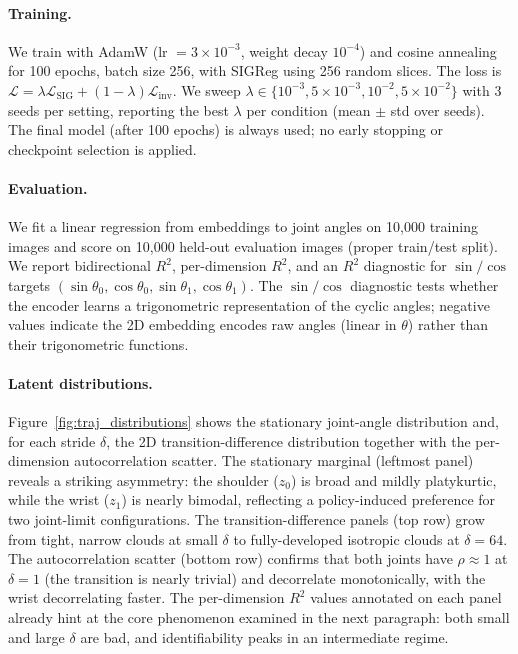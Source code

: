 \paragraph{Training.}
We train with AdamW (lr $= 3 \times 10^{-3}$, weight decay $10^{-4}$) and cosine annealing for 100 epochs, batch size 256, with SIGReg using 256 random slices.
The loss is $\mathcal{L} = \lambda \mathcal{L}_{\mathrm{SIG}} + (1 - \lambda) \mathcal{L}_{\mathrm{inv}}$.
We sweep $\lambda \in \{10^{-3}, 5 \times 10^{-3}, 10^{-2}, 5 \times 10^{-2}\}$ with 3 seeds per setting, reporting the best $\lambda$ per condition (mean $\pm$ std over seeds).
The final model (after 100 epochs) is always used; no early stopping or checkpoint selection is applied.

\paragraph{Evaluation.}
We fit a linear regression from embeddings to joint angles on 10{,}000 training images and score on 10{,}000 held-out evaluation images (proper train/test split).
We report bidirectional $R^2$, per-dimension $R^2$, and an $R^2$ diagnostic for $\sin/\cos$ targets $(\sin\theta_0, \cos\theta_0, \sin\theta_1, \cos\theta_1)$.
The $\sin/\cos$ diagnostic tests whether the encoder learns a trigonometric representation of the cyclic angles; negative values indicate the 2D embedding encodes raw angles (linear in $\theta$) rather than their trigonometric functions.

\paragraph{Latent distributions.}
Figure~\ref{fig:traj_distributions} shows the stationary joint-angle distribution and, for each stride $\delta$, the 2D transition-difference distribution together with the per-dimension autocorrelation scatter.
The stationary marginal (leftmost panel) reveals a striking asymmetry: the shoulder ($z_0$) is broad and mildly platykurtic, while the wrist ($z_1$) is nearly bimodal, reflecting a policy-induced preference for two joint-limit configurations.
The transition-difference panels (top row) grow from tight, narrow clouds at small $\delta$ to fully-developed isotropic clouds at $\delta = 64$.
The autocorrelation scatter (bottom row) confirms that both joints have $\rho \approx 1$ at $\delta = 1$ (the transition is nearly trivial) and decorrelate monotonically, with the wrist decorrelating faster.
The per-dimension $R^2$ values annotated on each panel already hint at the core phenomenon examined in the next paragraph: both small and large $\delta$ are bad, and identifiability peaks in an intermediate regime.

